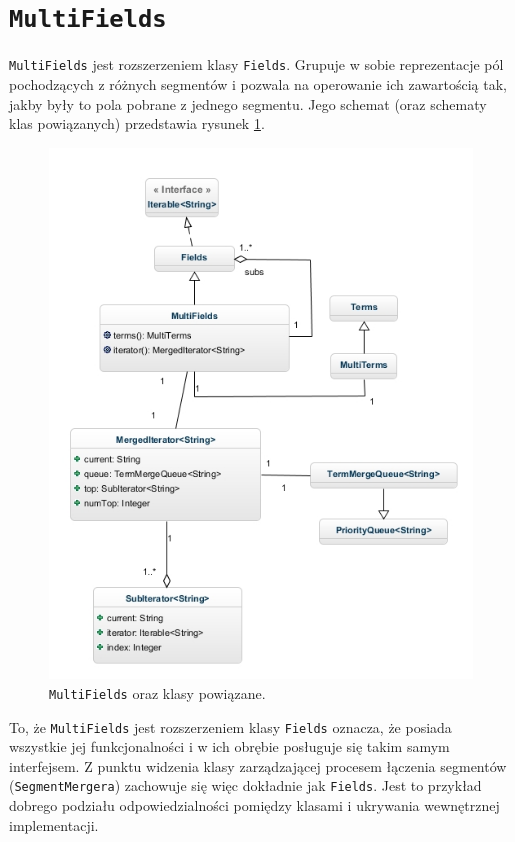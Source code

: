 \section{\texttt{MultiFields}}

\texttt{MultiFields} jest rozszerzeniem klasy \texttt{Fields}. Grupuje w sobie reprezentacje pól pochodzących z różnych segmentów i pozwala na operowanie ich zawartością tak, jakby były to pola pobrane z jednego segmentu. Jego schemat (oraz schematy klas powiązanych) przedstawia rysunek \ref{multiFields}.

\begin{figure}[here]
 \includegraphics[scale=0.6]{pictures/MultiFields.jpg}
 \caption{\texttt{MultiFields} oraz klasy powiązane.\label{multiFields}}
\end{figure}

To, że \texttt{MultiFields} jest rozszerzeniem klasy \texttt{Fields} oznacza, że posiada wszystkie jej funkcjonalności i w ich obrębie posługuje się takim samym interfejsem. Z punktu widzenia klasy zarządzającej procesem łączenia segmentów (\texttt{SegmentMergera}) zachowuje się więc dokładnie jak \texttt{Fields}. Jest to przykład dobrego podziału odpowiedzialności pomiędzy klasami i ukrywania wewnętrznej implementacji.

